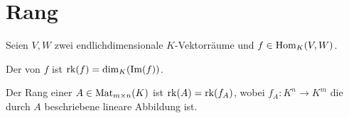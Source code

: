 \section{Rang}

Seien $V,W$ zwei endlichdimensionale $K$-Vektorräume und $f\in \operatorname{Hom}_K(V,W)$.

\begin{definition}[Rang]
	Der  von $f$ ist $\operatorname{rk}(f)=\dim_K(\operatorname{Im}(f))$.
\end{definition}

\begin{definition}
	Der Rang einer  $A\in \operatorname{Mat}_{m\times n}(K)$ ist $\operatorname{rk}(A)=\operatorname{rk}(f_A)$, wobei $f_A:K^n\to K^m$ 
	die durch $A$ beschriebene lineare Abbildung ist.
\end{definition}